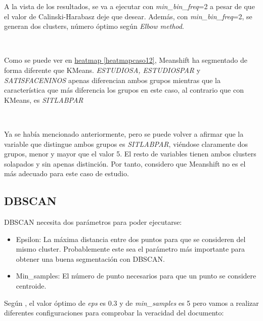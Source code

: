 \documentclass[paper=a4, fontsize=12pt]{article} %
\numberwithin{equation}{section} %
\numberwithin{figure}{section} %
\numberwithin{table}{section} %
\begin{document}
A la vista de los resultados, se va a ejecutar con \textit{min\_bin\_freq}=2 a pesar de que el valor de Calinski-Harabasz deje que desear. Además, con \textit{min\_bin\_freq}=2, se generan dos clusters, número óptimo según \textit{Elbow method}.

\begin{figure}[H]
    \centering
    \mbox {
    }
\end{figure}

Como se puede ver en \hyperref[heatmapcaso12]{heatmap \ref*{heatmapcaso12}}, Meanshift ha segmentado de forma diferente que KMeans. \textit{ESTUDIOSA, ESTUDIOSPAR} y \textit{SATISFACENINOS} apenas diferencian ambos grupos mientras que la característica que más diferencia los grupos en este caso, al contrario que con KMeans, es \textit{SITLABPAR}

\begin{figure}[H]
    \centering
    \mbox {
    }
\end{figure}

Ya se había mencionado anteriormente, pero se puede volver a afirmar que la variable que distingue ambos grupos es \textit{SITLABPAR}, viéndose claramente dos grupos, menor y mayor que el valor 5. El resto de variables tienen ambos clusters solapados y sin apenas distinción. Por tanto, considero que Meanshift no es el más adecuado para este caso de estudio.

\subsection{DBSCAN}
DBSCAN  necesita dos parámetros para poder ejecutarse: 
\begin{itemize}
\item Epsilon: La máxima distancia entre dos puntos para que se consideren del mismo cluster. Probablemente este sea el parámetro más importante para obtener una buena segmentación con DBSCAN.
\item Min\_samples: El número de punto necesarios para que un punto se considere centroide. 
\end{itemize}
Según \cite{eps}, el valor óptimo de \textit{eps} es 0.3 y de \textit{min\_samples} es 5 pero vamos a realizar diferentes configuraciones para comprobar la veracidad del documento:
\end{document}
